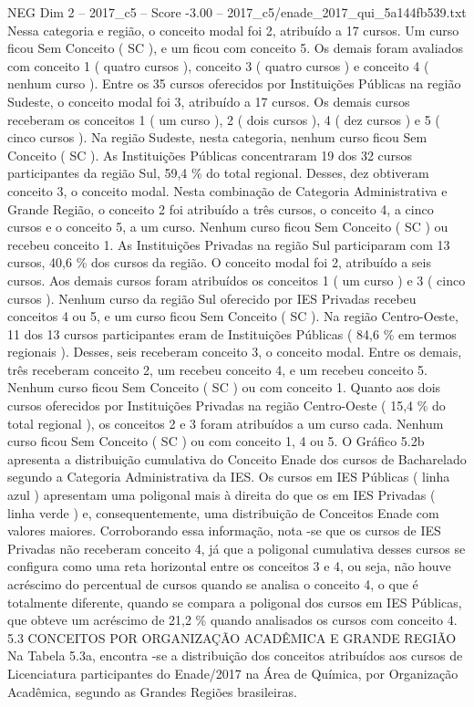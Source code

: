 \begin{textsample}{NEG Dim 2 – 2017\_c5 – Score -3.00 – 2017\_c5/enade\_2017\_qui\_5a144fb539.txt}
Nessa categoria e região, o conceito modal foi 2, atribuído a 17 cursos.
Um curso ficou Sem Conceito ( SC ), e um ficou com conceito 5.
Os demais foram avaliados com conceito 1 ( quatro cursos ), conceito 3 ( quatro cursos ) e conceito 4 ( nenhum curso ).
Entre os 35 cursos oferecidos por Instituições Públicas na região Sudeste, o conceito modal foi 3, atribuído a 17 cursos.
Os demais cursos receberam os conceitos 1 ( um curso ), 2 ( dois cursos ), 4 ( dez cursos ) e 5 ( cinco cursos ).
Na região Sudeste, nesta categoria, nenhum curso ficou Sem Conceito ( SC ).
As Instituições Públicas concentraram 19 dos 32 cursos participantes da região Sul, 59,4 \% do total regional.
Desses, dez obtiveram conceito 3, o conceito modal.
Nesta combinação de Categoria Administrativa e Grande Região, o conceito 2 foi atribuído a três cursos, o conceito 4, a cinco cursos e o conceito 5, a um curso.
Nenhum curso ficou Sem Conceito ( SC ) ou recebeu conceito 1.
As Instituições Privadas na região Sul participaram com 13 cursos, 40,6 \% dos cursos da região.
O conceito modal foi 2, atribuído a seis cursos.
Aos demais cursos foram atribuídos os conceitos 1 ( um curso ) e 3 ( cinco cursos ).
Nenhum curso da região Sul oferecido por IES Privadas recebeu conceitos 4 ou 5, e um curso ficou Sem Conceito ( SC ).
Na região Centro-Oeste, 11 dos 13 cursos participantes eram de Instituições Públicas ( 84,6 \% em termos regionais ).
Desses, seis receberam conceito 3, o conceito modal.
Entre os demais, três receberam conceito 2, um recebeu conceito 4, e um recebeu conceito 5.
Nenhum curso ficou Sem Conceito ( SC ) ou com conceito 1.
Quanto aos dois cursos oferecidos por Instituições Privadas na região Centro-Oeste ( 15,4 \% do total regional ), os conceitos 2 e 3 foram atribuídos a um curso cada.
Nenhum curso ficou Sem Conceito ( SC ) ou com conceito 1, 4 ou 5.
O Gráfico 5.2b apresenta a distribuição cumulativa do Conceito Enade dos cursos de Bacharelado segundo a Categoria Administrativa da IES.
Os cursos em IES Públicas ( linha azul ) apresentam uma poligonal mais à direita do que os em IES Privadas ( linha verde ) e, consequentemente, uma distribuição de Conceitos Enade com valores maiores.
Corroborando essa informação, nota -se que os cursos de IES Privadas não receberam conceito 4, já que a poligonal cumulativa desses cursos se configura como uma reta horizontal entre os conceitos 3 e 4, ou seja, não houve acréscimo do percentual de cursos quando se analisa o conceito 4, o que é totalmente diferente, quando se compara a poligonal dos cursos em IES Públicas, que obteve um acréscimo de 21,2 \% quando analisados os cursos com conceito 4. 5.3 CONCEITOS POR ORGANIZAÇÃO ACADÊMICA E GRANDE REGIÃO Na Tabela 5.3a, encontra -se a distribuição dos conceitos atribuídos aos cursos de Licenciatura participantes do Enade/2017 na Área de Química, por Organização Acadêmica, segundo as Grandes Regiões brasileiras.

\end{textsample}
